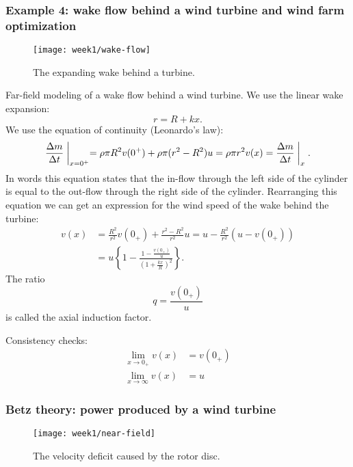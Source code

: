 \subsubsection{Example 4: wake flow behind a wind turbine and wind farm optimization}
\begin{figure}[h!]
    \centering
    \texttt{[image: week1/wake-flow]}
    \caption{The expanding wake behind a turbine.}
    \label{fig:wake-flow}
\end{figure}
Far-field modeling of a wake flow behind a wind turbine. We use the linear wake expansion:
\begin{equation}
    r = R + kx.
    \label{}
\end{equation}
We use the equation of continuity (Leonardo's law):
\begin{equation}
    \frac{\Delta m}{\Delta t}\biggm\vert_{x=0^+} = \rho\pi R^2v(0^+) + \rho\pi(r^2-R^2)u = \rho\pi r^2 v(x) = \frac{\Delta m}{\Delta t}\biggm\vert_x.
    \label{}
\end{equation}
In words this equation states that the in-flow through the left side of the cylinder is equal to the out-flow through the right side of the cylinder. Rearranging this equation we can get an expression for the wind speed of the wake behind the turbine:
\begin{align}
    v(x) &= \frac{R^2}{r^2}v(0_+)+\frac{r^2-R^2}{r^2}u = u-\frac{R^2}{r^2}\left(u-v(0_+)\right)\\
    &= u \left\{1-\frac{1-\frac{v(0_+)}{u}}{\left(1+\frac{kx}{R}\right)^2}\right\}.
    \label{eq:v-x}
\end{align}
The ratio
\begin{equation}
    q = \frac{v(0_+)}{u}
\end{equation}
is called the axial induction factor.

Consistency checks:
\begin{align}
    \lim_{x\rightarrow 0_+} v(x) &= v(0_+)\\
    \lim_{x\rightarrow\infty} v(x) &= u
\end{align}


\subsubsection*{Betz theory: power produced by a wind turbine}
\begin{figure}[h!]
    \centering
    \texttt{[image: week1/near-field]}
    \caption{The velocity deficit caused by the rotor disc.}
    \label{fig:betz}
\end{figure}

